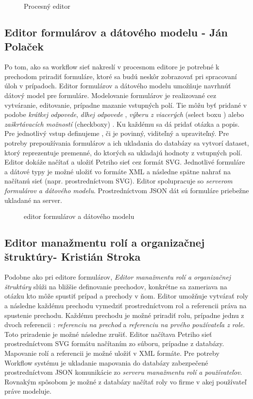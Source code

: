 \begin{figure}[h]
	\centering
	\caption{Procesný editor}
	\label{fig:Procesný editor}
\end{figure}


\subsection{Editor formulárov a dátového modelu - Ján Polaček}
\label{editor formulárov}
Po tom, ako sa workflow sieť nakreslí v procesnom editore je potrebné k prechodom priradiť formuláre, ktoré sa budú neskôr zobrazovať pri spracovaní úloh v prípadoch. Editor formulárov a dátového modelu umožňuje navrhnúť dátový model pre formuláre. Modelovanie formulárov je realizované cez vytváranie, editovanie, prípadne mazanie vstupných polí. Tie môžu byť pridané v podobe \emph{krátkej odpovede}, \emph{dlhej odpovede} , \emph{výberu z viacerých} (select boxu ) 	alebo \emph{zaškrtávacích možností } (checkboxy) . Ku každému sa dá pridať otázka a popis. Pre jednotlivý vstup definujeme , či je povinný, viditeľný a upraviteľný. Pre potreby prepoužívania formulárov a ich ukladania do databázy sa vytvorí dataset, ktorý reprezentuje premenné, do ktorých sa ukladajú hodnoty z vstupných polí. Editor dokáže načítať a uložiť Petriho sieť cez formát SVG. Jednotlivé formuláre a dátové typy je možné uložiť vo formáte XML a následne spätne nahrať na načítanú sieť (napr. prostredníctvom SVG). Editor spolupracuje so \emph{serverom formulárov a dátového modelu}. Prostredníctvom JSON dát sú formuláre priebežne ukladané na server.


\begin{figure}[h]
	\centering
	\caption{editor formulárov a dátového modelu}
	\label{fig:editor formulárov a dátového modelu}
\end{figure}


\subsection{Editor manažmentu rolí a organizačnej štruktúry- Kristián Stroka}
\label{Editor manažmentu rolí a organizačnej štruktúry}
Podobne ako pri editore formulárov, \emph{Editor manažmentu rolí a organizačnej štruktúry} slúži na bližšie definovanie prechodov, konkrétne sa zameriava na otázku kto môže spustiť prípad a prechody v ňom. Editor umožňuje vytvárať roly a následne každému prechodu vymedziť prostredníctvom  rol a referencii práva na spustenie prechodu. Každému prechodu je možné priradiť rolu, prípadne jednu z dvoch referencii : \emph{referenciu na prechod} a \emph{referenciu na prvého používateľa z role}. Toto priradenie je možné následne zrušiť. Editor načítava Petriho sieť prostredníctvom SVG formátu načítaním zo súboru, prípadne z databázy. Mapovanie rolí a referencii je možné uložiť v XML formáte. Pre potreby Workflow systému je ukladanie mapovania do databázy zabezpečené prostredníctvom JSON komunikácie  zo \emph{serveru manažmentu rolí a používateľov}. Rovnakým spôsobom je možné z databázy načítať roly vo firme v akej používateľ práve modeluje.

